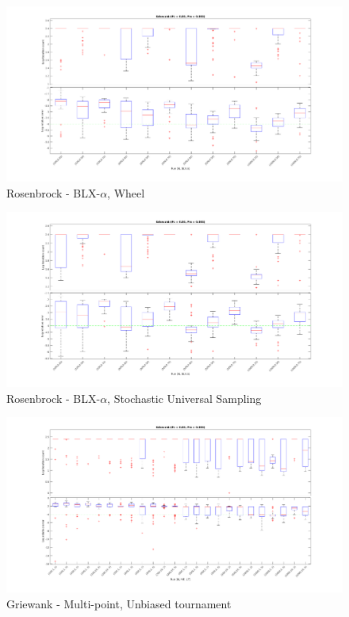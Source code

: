 \documentclass[12pt, letterpaper]{article}
\begin{document}
\begin{figure}
  \includegraphics[width=\linewidth]{img/g_blx_w.png}
  \centering
  \captionsetup{justification=centering}
  \caption{Rosenbrock - BLX-$\alpha$, Wheel}
  \label{fig:g_blx_w}
\end{figure}

\begin{figure}
  \includegraphics[width=\linewidth]{img/g_blx_sus.png}
  \centering
  \captionsetup{justification=centering}
  \caption{Rosenbrock - BLX-$\alpha$, Stochastic Universal Sampling}
  \label{fig:g_blx_sus}
\end{figure}

\begin{figure}
  \includegraphics[width=\linewidth]{img/g_mp_ut.png}
  \centering
  \captionsetup{justification=centering}
  \caption{Griewank - Multi-point, Unbiased tournament}
  \label{fig:g_mp_ut}
\end{figure}
\end{document}
